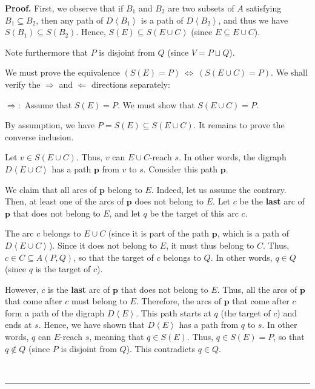\documentclass[numbers=enddot,12pt,final,onecolumn,notitlepage]{scrartcl}%
\theoremstyle{definition}
\newenvironment{proof}[1][Proof]{\noindent\textbf{#1.} }{\ \rule{0.5em}{0.5em}}
\theoremstyle{plainsl}
\begin{document}
\begin{proof}
First, we observe that if $B_{1}$ and $B_{2}$ are two subsets of $A$
satisfying $B_{1}\subseteq B_{2}$, then any path of $D\left\langle
B_{1}\right\rangle $ is a path of $D\left\langle B_{2}\right\rangle $, and
thus we have $S\left(  B_{1}\right)  \subseteq S\left(  B_{2}\right)  $.
Hence, $S\left(  E\right)  \subseteq S\left(  E\cup C\right)  $ (since
$E\subseteq E\cup C$).

Note furthermore that $P$ is disjoint from $Q$ (since $V=P\sqcup Q$).

We must prove the equivalence $\left(  S\left(  E\right)  =P\right)
\ \Longleftrightarrow\ \left(  S\left(  E\cup C\right)  =P\right)  $. We shall
verify the $\Longrightarrow$ and $\Longleftarrow$ directions separately:
\medskip

$\Longrightarrow:$ Assume that $S\left(  E\right)  =P$. We must show that
$S\left(  E\cup C\right)  =P$.

By assumption, we have $P=S\left(  E\right)  \subseteq S\left(  E\cup
C\right)  $. It remains to prove the converse inclusion.

Let $v\in S\left(  E\cup C\right)  $. Thus, $v$ can $E\cup C$-reach $s$. In
other words, the digraph $D\left\langle E\cup C\right\rangle $ has a path
$\mathbf{p}$ from $v$ to $s$. Consider this path $\mathbf{p}$.

We claim that all arcs of $\mathbf{p}$ belong to $E$. Indeed, let us assume
the contrary. Then, at least one of the arcs of $\mathbf{p}$ does not belong
to $E$. Let $c$ be the \textbf{last} arc of $\mathbf{p}$ that does not belong
to $E$, and let $q$ be the target of this arc $c$.

The arc $c$ belongs to $E\cup C$ (since it is part of the path $\mathbf{p}$,
which is a path of $D\left\langle E\cup C\right\rangle $). Since it does not
belong to $E$, it must thus belong to $C$. Thus, $c\in C\subseteq A\left(
P,Q\right)  $, so that the target of $c$ belongs to $Q$. In other words, $q\in
Q$ (since $q$ is the target of $c$).

However, $c$ is the \textbf{last} arc of $\mathbf{p}$ that does not belong to
$E$. Thus, all the arcs of $\mathbf{p}$ that come after $c$ must belong to
$E$. Therefore, the arcs of $\mathbf{p}$ that come after $c$ form a path of
the digraph $D\left\langle E\right\rangle $. This path starts at $q$ (the
target of $c$) and ends at $s$. Hence, we have shown that $D\left\langle
E\right\rangle $ has a path from $q$ to $s$. In other words, $q$ can $E$-reach
$s$, meaning that $q\in S\left(  E\right)  $. Thus, $q\in S\left(  E\right)
=P$, so that $q\notin Q$ (since $P$ is disjoint from $Q$). This contradicts
$q\in Q$.


\end{proof}
\end{document}
